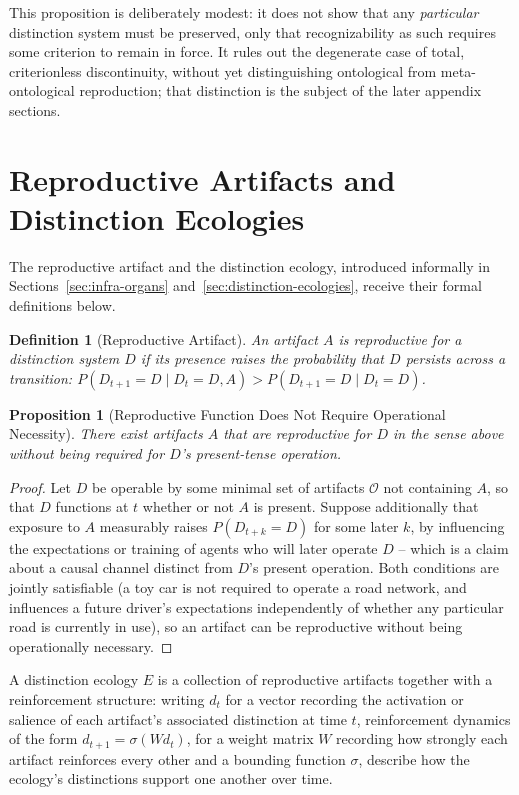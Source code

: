 \documentclass[11pt]{article}
\theoremstyle{plain}
\newtheorem{definition}{Definition}[section]
\newtheorem{proposition}{Proposition}[section]
\begin{document}
\noindent This proposition is deliberately modest: it does not show that any \emph{particular} distinction system must be preserved, only that recognizability as such requires some criterion to remain in force. It rules out the degenerate case of total, criterionless discontinuity, without yet distinguishing ontological from meta-ontological reproduction; that distinction is the subject of the later appendix sections.

\section{Reproductive Artifacts and Distinction Ecologies}
\label{app:reproductive-artifacts}

\noindent The reproductive artifact and the distinction ecology, introduced informally in Sections~\ref{sec:infra-organs} and~\ref{sec:distinction-ecologies}, receive their formal definitions below.

\begin{definition}[Reproductive Artifact]
An artifact $A$ is reproductive for a distinction system $D$ if its presence raises the probability that $D$ persists across a transition: $P(D_{t+1} = D \mid D_t = D, A) > P(D_{t+1} = D \mid D_t = D)$.
\end{definition}

\begin{proposition}[Reproductive Function Does Not Require Operational Necessity]
There exist artifacts $A$ that are reproductive for $D$ in the sense above without being required for $D$'s present-tense operation.
\end{proposition}
\begin{proof}
Let $D$ be operable by some minimal set of artifacts $\mathcal{O}$ not containing $A$, so that $D$ functions at $t$ whether or not $A$ is present. Suppose additionally that exposure to $A$ measurably raises $P(D_{t+k} = D)$ for some later $k$, by influencing the expectations or training of agents who will later operate $D$ -- which is a claim about a causal channel distinct from $D$'s present operation. Both conditions are jointly satisfiable (a toy car is not required to operate a road network, and influences a future driver's expectations independently of whether any particular road is currently in use), so an artifact can be reproductive without being operationally necessary.
\end{proof}

\noindent A distinction ecology $E$ is a collection of reproductive artifacts together with a reinforcement structure: writing $d_t$ for a vector recording the activation or salience of each artifact's associated distinction at time $t$, reinforcement dynamics of the form $d_{t+1} = \sigma(Wd_t)$, for a weight matrix $W$ recording how strongly each artifact reinforces every other and a bounding function $\sigma$, describe how the ecology's distinctions support one another over time.
\end{document}
